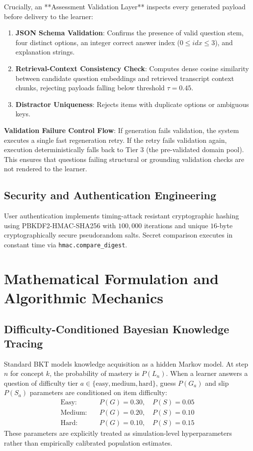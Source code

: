 \documentclass[journal]{IEEEtran}
\begin{document}
Crucially, an **Assessment Validation Layer** inspects every generated payload before delivery to the learner:
\begin{enumerate}
    \item \textbf{JSON Schema Validation}: Confirms the presence of valid question stem, four distinct options, an integer correct answer index ($0 \le idx \le 3$), and explanation strings.
    \item \textbf{Retrieval-Context Consistency Check}: Computes dense cosine similarity between candidate question embeddings and retrieved transcript context chunks, rejecting payloads falling below threshold $\tau = 0.45$.
    \item \textbf{Distractor Uniqueness}: Rejects items with duplicate options or ambiguous keys.
\end{enumerate}
\textbf{Validation Failure Control Flow}: If generation fails validation, the system executes a single fast regeneration retry. If the retry fails validation again, execution deterministically falls back to Tier 3 (the pre-validated domain pool). This ensures that questions failing structural or grounding validation checks are not rendered to the learner.

\subsection{Security and Authentication Engineering}
User authentication implements timing-attack resistant cryptographic hashing using PBKDF2-HMAC-SHA256 with $100,000$ iterations and unique $16$-byte cryptographically secure pseudorandom salts. Secret comparison executes in constant time via \texttt{hmac.compare\_digest}.

%
%
\section{Mathematical Formulation and Algorithmic Mechanics}

\subsection{Difficulty-Conditioned Bayesian Knowledge Tracing}
Standard BKT models knowledge acquisition as a hidden Markov model. At step $n$ for concept $k$, the probability of mastery is $P(L_n)$. When a learner answers a question of difficulty tier $a \in \{\text{easy}, \text{medium}, \text{hard}\}$, guess $P(G_a)$ and slip $P(S_a)$ parameters are conditioned on item difficulty:
\begin{align}
\text{Easy}: \quad & P(G) = 0.30, \quad P(S) = 0.05 \\
\text{Medium}: \quad & P(G) = 0.20, \quad P(S) = 0.10 \\
\text{Hard}: \quad & P(G) = 0.10, \quad P(S) = 0.15
\end{align}
These parameters are explicitly treated as simulation-level hyperparameters rather than empirically calibrated population estimates.
\end{document}
